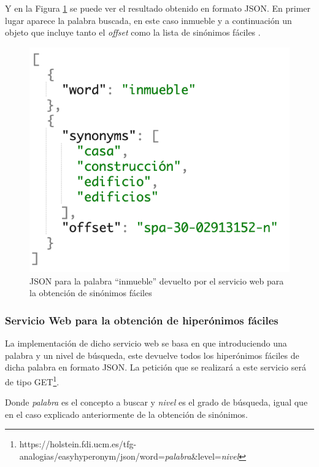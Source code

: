 Y en la Figura \ref{fig:peticionGetEasySynonym} se puede ver el resultado obtenido en formato JSON. En primer lugar aparece la palabra buscada, en este caso inmueble y a continuación un objeto que incluye tanto el \textit{offset} como la lista de sinónimos fáciles .

\begin{figure}[!h]
	\includegraphics[width=.6\textwidth]{Imagenes/Bitmap/Capitulo4/JSON-SW/peticionGetEasySynonym.png}
	\centering
	\caption{JSON  para la palabra ``inmueble'' devuelto por el servicio web para la obtención de sinónimos fáciles}
	\label{fig:peticionGetEasySynonym}
\end{figure}


\subsubsection{Servicio Web para la obtención de hiperónimos fáciles}
\label{cap:subsec:sw_hiperonimosfaciles}
La implementación de dicho servicio web se basa en que introduciendo una palabra y un nivel de búsqueda, este devuelve todos los hiperónimos fáciles de dicha palabra en formato JSON. La petición que se realizará a este servicio será de tipo GET\footnote{https://holstein.fdi.ucm.es/tfg-analogias/easyhyperonym/json/word=\textit{palabra}\&level=\textit{nivel}}.

Donde \textit{palabra} es el concepto a buscar y \textit{nivel} es el grado de búsqueda, igual que en el caso explicado anteriormente de la obtención de sinónimos.

